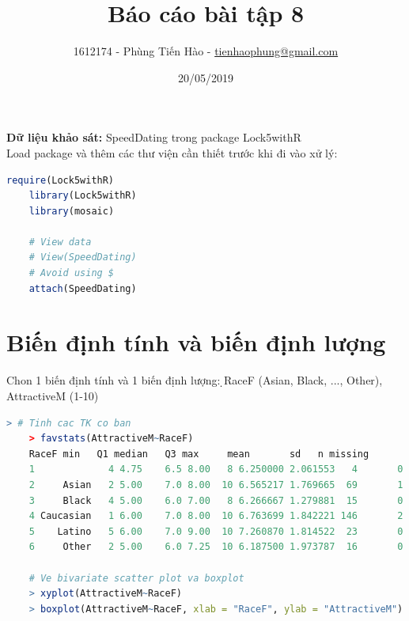 \documentclass[a4paper,12pt]{article}
\title{Báo cáo bài tập 8}
\author{1612174 - Phùng Tiến Hào - \href{mailto:tienhaophung@gmail.com}{tienhaophung@gmail.com}}
\date{20/05/2019}
\begin{document}
	\maketitle
	\newpage
	
	\doublespacing
	\tableofcontents
	\singlespace
	
	\newpage
	
	\textbf{Dữ liệu khảo sát:} SpeedDating trong package Lock5withR\\
	
	Load package và thêm các thư viện cần thiết trước khi đi vào xử lý:
	\begin{lstlisting}[language=R]
	require(Lock5withR)
	library(Lock5withR)
	library(mosaic)
	
	# View data
	# View(SpeedDating)
	# Avoid using $
	attach(SpeedDating)
	\end{lstlisting}
	
	\section{Biến định tính và biến định lượng}
	Chon 1 biến định tính và 1 biến định lượng: ̣RaceF (Asian, Black, ..., Other), AttractiveM (1-10)
	\begin{lstlisting}[language=R]
	> # Tinh cac TK co ban
	> favstats(AttractiveM~RaceF)
	RaceF min   Q1 median   Q3 max     mean       sd   n missing
	1             4 4.75    6.5 8.00   8 6.250000 2.061553   4       0
	2     Asian   2 5.00    7.0 8.00  10 6.565217 1.769665  69       1
	3     Black   4 5.00    6.0 7.00   8 6.266667 1.279881  15       0
	4 Caucasian   1 6.00    7.0 8.00  10 6.763699 1.842221 146       2
	5    Latino   5 6.00    7.0 9.00  10 7.260870 1.814522  23       0
	6     Other   2 5.00    6.0 7.25  10 6.187500 1.973787  16       0
	
	# Ve bivariate scatter plot va boxplot
	> xyplot(AttractiveM~RaceF)
	> boxplot(AttractiveM~RaceF, xlab = "RaceF", ylab = "AttractiveM")
	\end{lstlisting}
	
\end{document}
